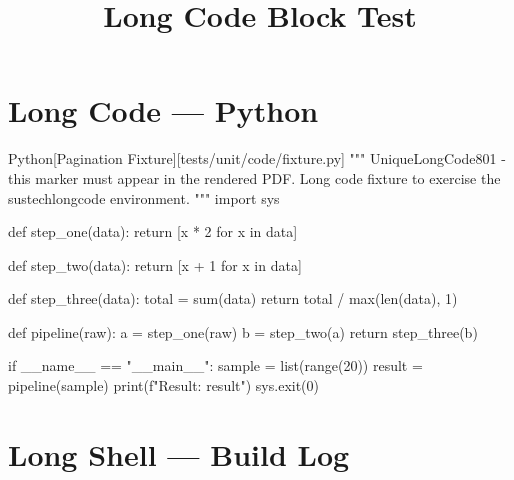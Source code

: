\documentclass[code=listings]{SUSTechHomework}
\title{Long Code Block Test}
\begin{document}
\maketitle

\section{Long Code --- Python}

\begin{sustechlongcode}{Python}[Pagination Fixture][tests/unit/code/fixture.py]
"""
UniqueLongCode801 - this marker must appear in the rendered PDF.
Long code fixture to exercise the sustechlongcode environment.
"""
import sys

def step_one(data):
    return [x * 2 for x in data]

def step_two(data):
    return [x + 1 for x in data]

def step_three(data):
    total = sum(data)
    return total / max(len(data), 1)

def pipeline(raw):
    a = step_one(raw)
    b = step_two(a)
    return step_three(b)

if __name__ == "__main__":
    sample = list(range(20))
    result = pipeline(sample)
    print(f"Result: {result}")
    sys.exit(0)
\end{sustechlongcode}

\section{Long Shell --- Build Log}

\end{document}
